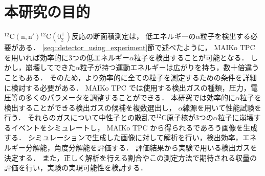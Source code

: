 \documentclass[../master]{subfiles}
\begin{document}
\section{本研究の目的}
${}^{12}\mathrm{C}(\mathrm{n},\mathrm{n}'){}^{12}\mathrm{C} (0_2^+)$反応の断面積測定は，
低エネルギーの$\alpha$粒子を検出する必要がある．
\ref{seq::detector_using_experiment}節で述べたように，
MAIKo TPC を用いれば効率的に3つの低エネルギー$\alpha$粒子を検出することが可能となる．
しかし，崩壊してできた$\alpha$粒子が持つ運動エネルギーは広がりを持ち，数十倍違うこともある．
そのため，より効率的に全ての粒子を測定するための条件を詳細に検討する必要がある．
MAIKo TPC では使用する検出ガスの種類，圧力，電圧等の多くのパラメータを調整することができる．
本研究では効率的に$\alpha$粒子を検出することができる検出ガスの候補を複数選出し，
$\alpha$線源を用いて性能試験を行う．
それらのガスについて中性子との散乱で${}^{12}\mathrm{C}$原子核が3つの$\alpha$粒子に崩壊するイベントをシミュレートし，
MAIKo TPC から得られるであろう画像を生成する．
シミュレーションで生成した画像に対して解析を行い，検出効率，エネルギー分解能，角度分解能を評価する．
評価結果から実験で用いる検出ガスを決定する．
また，正しく解析を行える割合やこの測定方法で期待される収量の評価を行い，実験の実現可能性を検討する．
\end{document}
